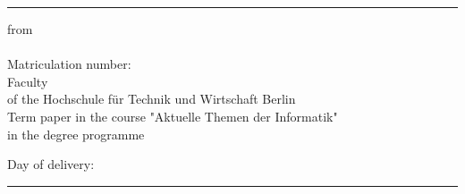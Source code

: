 {      \textcolor{HKS66}{\rule{\linewidth}{.4mm}}
      \begin{center}
        \begin{hsheadfont}
          \textcolor{\headcolor}{\LARGE \textbf{\thetitel}}
        \end{hsheadfont}
      \end{center}
      \begin{hsheadfont}
        \begin{center}
          \textbf{\Large{\thethesistyp}}
        \end{center}
      \end{hsheadfont}
      \begin{center}
        \begin{hsfont}
          from\\[2ex]
          {\textbf{\large\theautor}}\\[2ex]
          Matriculation number: \thematrikelnr\\[2ex]
          Faculty \thefachbereich\\
          of the Hochschule für Technik und Wirtschaft Berlin\\[2ex]
          Term paper in the course "Aktuelle Themen der Informatik" \\
          in the degree programme\\
          \textbf{\thestudiengang}
        \end{hsfont}
      \end{center}
     
       \begin{center}
         Day of delivery: \thedatum 
       \end{center}
         
      
      \thebetreuerFeld
      

      \textcolor{HKS66}{\rule{\linewidth}{0.4mm}}\\[1.5ex]
       \begin{hsheadfont}
         ~\hfill~
       \end{hsheadfont}
    }
    
